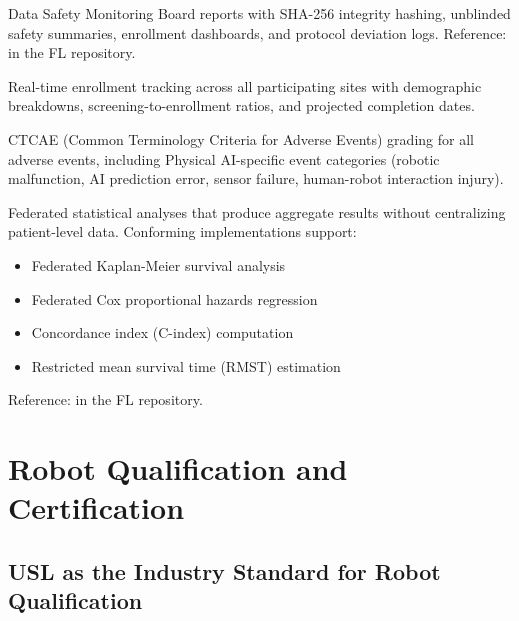 \documentclass[11pt,letterpaper]{article}
\begin{document}
\begin{description}[leftmargin=3.5cm, style=sameline]
  \item[DSMB Packages] Data Safety Monitoring Board reports with SHA-256 integrity hashing, unblinded safety summaries, enrollment dashboards, and protocol deviation logs. Reference:  in the FL repository.

  \item[Enrollment Dashboards] Real-time enrollment tracking across all participating sites with demographic breakdowns, screening-to-enrollment ratios, and projected completion dates.

  \item[Adverse Event Grading] CTCAE (Common Terminology Criteria for Adverse Events) grading for all adverse events, including Physical AI-specific event categories (robotic malfunction, AI prediction error, sensor failure, human-robot interaction injury).

  \item[Privacy-Preserving Analytics] Federated statistical analyses that produce aggregate results without centralizing patient-level data. Conforming implementations \SHALL{} support:
  \begin{itemize}
    \item Federated Kaplan-Meier survival analysis
    \item Federated Cox proportional hazards regression
    \item Concordance index (C-index) computation
    \item Restricted mean survival time (RMST) estimation
  \end{itemize}
  Reference:  in the FL repository.
\end{description}

\section{Robot Qualification and Certification}
\label{sec:part5}

\subsection{USL as the Industry Standard for Robot Qualification}
\end{document}
